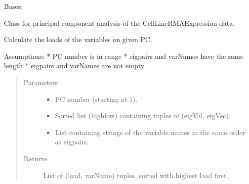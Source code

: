 \documentclass[letterpaper,10pt,english]{sphinxmanual}
\begin{document}
\begin{fulllineitems}
\label{\detokenize{AssignmentPCA:AssignmentPCA.AssignmentPCA}}
\sphinxAtStartPar
Bases: 

\sphinxAtStartPar
Class for principal component analysis of the CellLineRMAExpression data.

\begin{fulllineitems}
\label{\detokenize{AssignmentPCA:AssignmentPCA.AssignmentPCA.calcLoads}}
\sphinxAtStartPar
Calculate the loads of the variables on given PC.

\sphinxAtStartPar
Assumptions: 
* PC number is in range 
* eigpairs and varNames have the same length
* eigpairs and varNames are not empty
\begin{quote}\begin{description}
\item[{Parameters}] \leavevmode\begin{itemize}
\item {} 
\sphinxAtStartPar
{} \sphinxhyphen{}\sphinxhyphen{} PC number (starting at 1).

\item {} 
\sphinxAtStartPar
{} \sphinxhyphen{}\sphinxhyphen{} Sorted list (high\sphinxhyphen{}low) containing tuples of (eigVal, eigVec).

\item {} 
\sphinxAtStartPar
{} \sphinxhyphen{}\sphinxhyphen{} List containing strings of the variable names in the same order as eigpairs.

\end{itemize}

\item[{Returns}] \leavevmode
\sphinxAtStartPar
List of (load, varName) tuples, sorted with highest load first.

\end{description}\end{quote}


\end{fulllineitems}
\end{fulllineitems}
\end{document}
